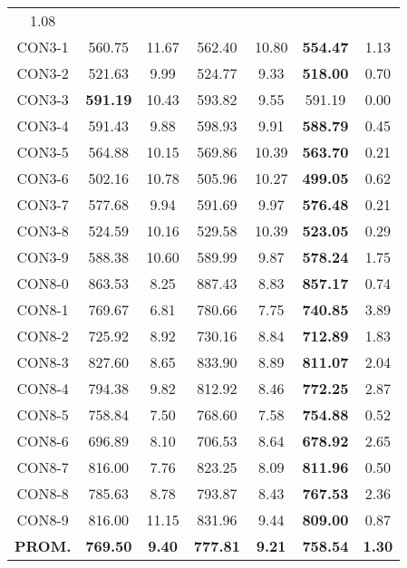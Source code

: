 \begin{table}[ht]
\begin{tabular}{c c c c c c c}
1.08\\CON3-1 & 560.75 & 11.67 & 
562.40 & 10.80 & \bf{554.47} & 
1.13\\CON3-2 & 521.63 & 9.99 & 
524.77 & 9.33 & \bf{518.00} & 
0.70\\CON3-3 & \bf{591.19} & 10.43 & 
593.82 & 9.55 & 591.19 & 0.00\\
CON3-4 & 591.43 & 9.88 & 
598.93 & 9.91 & \bf{588.79} & 
0.45\\CON3-5 & 564.88 & 10.15 & 
569.86 & 10.39 & \bf{563.70} & 
0.21\\CON3-6 & 502.16 & 10.78 & 
505.96 & 10.27 & \bf{499.05} & 
0.62\\CON3-7 & 577.68 & 9.94 & 
591.69 & 9.97 & \bf{576.48} & 
0.21\\CON3-8 & 524.59 & 10.16 & 
529.58 & 10.39 & \bf{523.05} & 
0.29\\CON3-9 & 588.38 & 10.60 & 
589.99 & 9.87 & \bf{578.24} & 
1.75\\CON8-0 & 863.53 & 8.25 & 
887.43 & 8.83 & \bf{857.17} & 
0.74\\CON8-1 & 769.67 & 6.81 & 
780.66 & 7.75 & \bf{740.85} & 
3.89\\CON8-2 & 725.92 & 8.92 & 
730.16 & 8.84 & \bf{712.89} & 
1.83\\CON8-3 & 827.60 & 8.65 & 
833.90 & 8.89 & \bf{811.07} & 
2.04\\CON8-4 & 794.38 & 9.82 & 
812.92 & 8.46 & \bf{772.25} & 
2.87\\CON8-5 & 758.84 & 7.50 & 
768.60 & 7.58 & \bf{754.88} & 
0.52\\CON8-6 & 696.89 & 8.10 & 
706.53 & 8.64 & \bf{678.92} & 
2.65\\CON8-7 & 816.00 & 7.76 & 
823.25 & 8.09 & \bf{811.96} & 
0.50\\CON8-8 & 785.63 & 8.78 & 
793.87 & 8.43 & \bf{767.53} & 
2.36\\CON8-9 & 816.00 & 11.15 & 
831.96 & 9.44 & \bf{809.00} & 
0.87\\\bf{PROM.} & 
\bf{769.50} & \bf{9.40} & \bf{777.81} & \bf{9.21} & \bf{758.54} & \bf{1.30}\\[1ex]\hline
\end{tabular}
\label{table:nonlin}
\end{table} \clearpage
